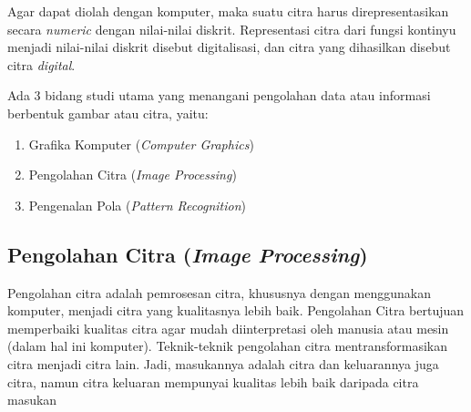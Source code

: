 	Agar dapat diolah dengan komputer, maka suatu citra harus direpresentasikan secara \emph{numeric} dengan nilai-nilai diskrit. Representasi citra dari fungsi kontinyu menjadi nilai-nilai diskrit disebut digitalisasi, dan citra yang dihasilkan disebut citra \emph{digital}.
	
	Ada 3 bidang studi utama yang menangani pengolahan data atau informasi berbentuk gambar atau citra, yaitu:
	\begin{enumerate}
		\item Grafika Komputer (\emph{Computer Graphics})
		\item Pengolahan Citra (\emph{Image Processing})
		\item Pengenalan Pola (\emph{Pattern Recognition})
	\end{enumerate}
	
	\subsection{Pengolahan Citra (\emph{Image Processing})}
	Pengolahan citra adalah pemrosesan citra, khususnya dengan menggunakan komputer, menjadi citra yang kualitasnya lebih baik. Pengolahan Citra bertujuan memperbaiki kualitas citra agar mudah diinterpretasi oleh manusia atau mesin (dalam hal ini komputer). Teknik-teknik pengolahan citra mentransformasikan citra menjadi citra lain. Jadi, masukannya adalah citra dan keluarannya juga citra, namun citra keluaran mempunyai kualitas lebih baik daripada citra masukan \cite{munir04}
	
